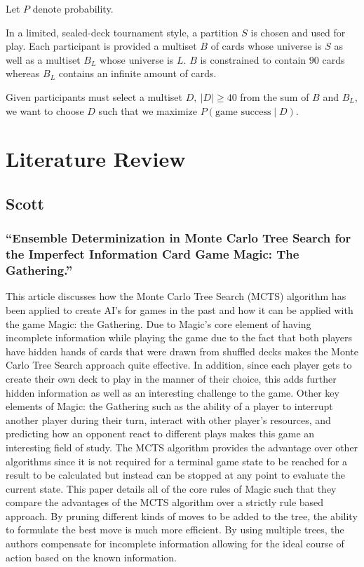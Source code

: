 \documentclass[12pt, letterpaper]{article}
\begin{document}
Let $ P $ denote probability.

In a limited, sealed-deck tournament style, a partition $ S $ is chosen and used for play.
Each participant is provided a multiset $ B $ of cards whose universe is $ S $
as well as a multiset $ B_L $ whose universe is $ L $.
$ B $ is constrained to contain $ 90 $ cards
whereas $ B_L $ contains an infinite amount of cards.

Given participants must select a multiset $ D, \ |D| \ge 40 $ from the sum of $ B $ and $ B_L $,
we want to choose $ D $ such that we maximize $ P(\text{game success} \mid D) $.

\section{Literature Review}

\subsection{Scott}

\subsubsection{\enquote{Ensemble Determinization in Monte Carlo Tree Search for the Imperfect Information Card Game Magic: The Gathering.}}

This article discusses how the Monte Carlo Tree Search (MCTS) algorithm has been applied to create AI’s for games in the
past and how it can be applied with the game Magic: the Gathering. Due to Magic’s core element of having incomplete
information while playing the game due to the fact that both players have hidden hands of cards that were drawn from
shuffled decks makes the Monte Carlo Tree Search approach quite effective. In addition, since each player gets to
create their own deck to play in the manner of their choice, this adds further hidden information as well as an
interesting challenge to the game. Other key elements of Magic: the Gathering such as the ability of a player to
interrupt another player during their turn, interact with other player’s resources, and predicting how an opponent
react to different plays makes this game an interesting field of study. The MCTS algorithm provides the advantage over
other algorithms since it is not required for a terminal game state to be reached for a result to be calculated but
instead can be stopped at any point to evaluate the current state. This paper details all of the core rules of Magic
such that they compare the advantages of the MCTS algorithm over a strictly rule based approach. By pruning different
kinds of moves to be added to the tree, the ability to formulate the best move is much more efficient. By using multiple
trees, the authors compensate for incomplete information allowing for the ideal course of action based on the known
information.
\end{document}
